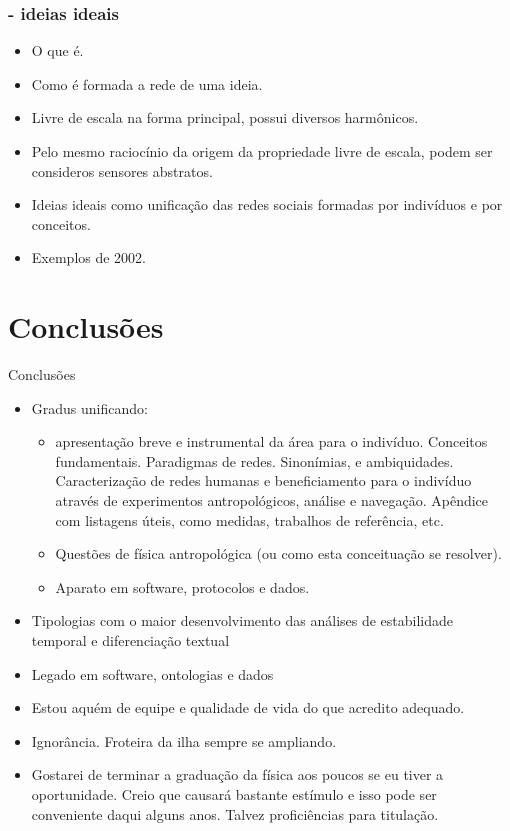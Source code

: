 \documentclass[10pt]{beamer}
\begin{document}
\begin{frame}
\frametitle{- ideias ideais}
\begin{itemize}
\item O que é.
\item Como é formada a rede de uma ideia.
\item Livre de escala na forma principal, possui diversos harmônicos.
\item Pelo mesmo raciocínio da origem da propriedade livre de escala, podem ser consideros sensores abstratos.
\item Ideias ideais como unificação das redes sociais formadas por indivíduos e por conceitos.
\item Exemplos de 2002.
\end{itemize}
\end{frame}

\section{Conclusões}
\begin{frame}{Conclusões}
\begin{itemize}
	\item Gradus unificando:
		\begin{itemize}
			\item  apresentação breve e instrumental da área para o indivíduo. Conceitos fundamentais. Paradigmas de redes. Sinonímias, e ambiquidades. Caracterização de redes humanas e beneficiamento para o indivíduo através de experimentos antropológicos, análise e navegação.
				Apêndice com listagens úteis, como medidas, trabalhos de referência, etc.
			\item Questões de física antropológica (ou como esta conceituação se resolver).
			\item Aparato em software, protocolos e dados.
		\end{itemize}
	\item Tipologias com o maior desenvolvimento das análises de estabilidade temporal e diferenciação textual
	\item Legado em software, ontologias e dados
	\item Estou aquém de equipe e qualidade de vida do que acredito adequado. 
	\item Ignorância. Froteira da ilha sempre se ampliando.
	\item Gostarei de terminar a graduação da física aos poucos se eu tiver a oportunidade. Creio que causará bastante estímulo e isso pode ser conveniente daqui alguns anos. Talvez proficiências para titulação.
\end{itemize}
\end{frame}
\end{document}
